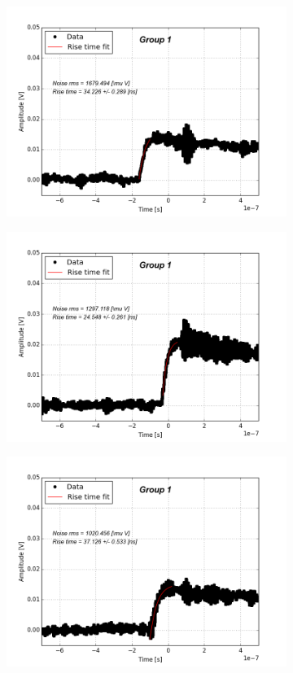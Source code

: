 \documentclass[12pt]{article}
\begin{document}
\begin{figure}[t!]
\begin{subfigure}[t]{0.45\textwidth}
    \includegraphics[width=1.2\textwidth]{./graphics/data_2.png}
  \end{subfigure}
  \hfill
  \begin{subfigure}[t]{0.45\textwidth}
    \centering
    \includegraphics[width=1.2\textwidth]{./graphics/data_3.png}
  \end{subfigure}
  \hfill
  \begin{subfigure}[t]{0.45\textwidth}
    \centering
    \includegraphics[width=1.2\textwidth]{./graphics/data_4.png}

\end{subfigure}
\end{figure}
\end{document}
